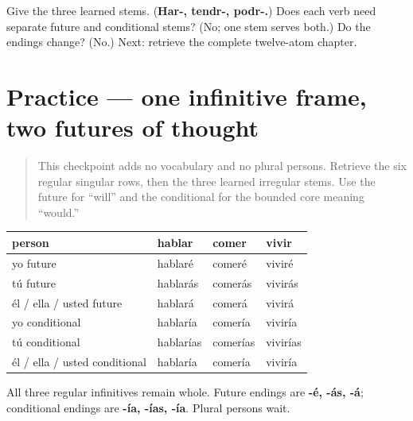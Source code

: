 \begin{tcolorbox}[breakable,colback=teal!4,colframe=teal!35!black,title={Before you move on}]
Give the three learned stems. (\textbf{Har-, tendr-, podr-.}) Does each verb need separate future and conditional stems? (No; one stem serves both.) Do the endings change? (No.) Next: retrieve the complete twelve-atom chapter.
\end{tcolorbox}
\section[Practice]{Practice — one infinitive frame, two futures of thought}

\label{lesson:ES-C17-practice}



\begin{quote}
This checkpoint adds no vocabulary and no plural persons. Retrieve the six regular singular rows, then the three learned irregular stems. Use the future for “will” and the conditional for the bounded core meaning “would.”
\end{quote}

\begin{grammarlens}[title={Grammar Lens: the regular frame}]
\noindent
\begin{tabularx}{\linewidth}{@{}>{\raggedright\arraybackslash}X>{\raggedright\arraybackslash}X>{\raggedright\arraybackslash}X>{\raggedright\arraybackslash}X@{}}
\toprule
\textbf{person} & \textbf{hablar} & \textbf{comer} & \textbf{vivir} \\
\midrule
yo future & hablaré & comeré & viviré \\
tú future & hablarás & comerás & vivirás \\
él / ella / usted future & hablará & comerá & vivirá \\
yo conditional & hablaría & comería & viviría \\
tú conditional & hablarías & comerías & vivirías \\
él / ella / usted conditional & hablaría & comería & viviría \\
\bottomrule
\end{tabularx}

All three regular infinitives remain whole. Future endings are \textbf{-é, -ás, -á}; conditional endings are \textbf{-ía, -ías, -ía}. Plural persons wait.
\end{grammarlens}

